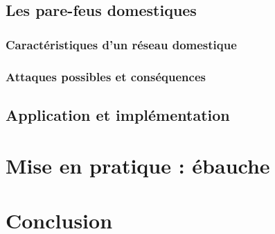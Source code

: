 \documentclass[]{article}
\begin{document}
\subsection{Les pare-feus domestiques}

\subsubsection{Caractéristiques d'un réseau domestique}

\subsubsection{Attaques possibles et conséquences}

\subsection{Application et implémentation}

\newpage

\section{Mise en pratique : ébauche}
\newpage
\section*{Conclusion}
\end{document}
